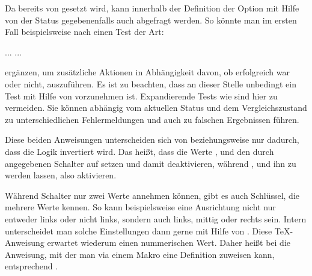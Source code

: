 \begin{Example}
  Da  bereits von 
  gesetzt wird, kann innerhalb der Definition der Option mit Hilfe von
   der Status gegebenenfalls auch
  abgefragt werden. So könnte man im ersten Fall beispielsweise nach
   einen Test der Art:
\begin{lstcode}
  \ifx\FamilyKeyState\FamilyKeyStateProcessed
      ...
  \else
      ...
  \fi   
\end{lstcode}
  ergänzen, um zusätzliche Aktionen in Abhängigkeit davon, ob
   erfolgreich war oder nicht,
  auszuführen. Es ist zu beachten, dass an dieser Stelle
  unbedingt ein Test mit Hilfe von  vorzunehmen ist. Expandierende
  Tests wie  sind hier zu vermeiden. Sie können
  abhängig vom aktuellen Status und dem Vergleichszustand zu unterschiedlichen
  Fehlermeldungen und auch zu falschen Ergebnissen führen.%
\end{Example}%
\EndIndexGroup
\ExampleEndFix


\begin{Declaration}
\end{Declaration}%
Diese beiden Anweisungen unterscheiden
sich von  beziehungsweise
 nur dadurch, dass die Logik invertiert
wird. Das heißt, dass die Werte ,  und 
den durch  angegebenen Schalter auf  setzen
und damit deaktivieren, während ,  und 
ihn zu  werden lassen, also aktivieren.%
\EndIndexGroup

\begin{Declaration}
\end{Declaration}
Während Schalter nur zwei Werte annehmen können, gibt es auch Schlüssel, die
mehrere Werte kennen. So kann beispielsweise eine Ausrichtung nicht nur
entweder links oder nicht links, sondern auch links, mittig oder rechts
sein. Intern unterscheidet man solche Einstellungen dann gerne mit Hilfe von
. Diese \TeX-Anweisung erwartet wiederum einen
nummerischen Wert. Daher heißt bei  die Anweisung, mit der
man via  einem Makro eine Definition zuweisen kann,
entsprechend .

